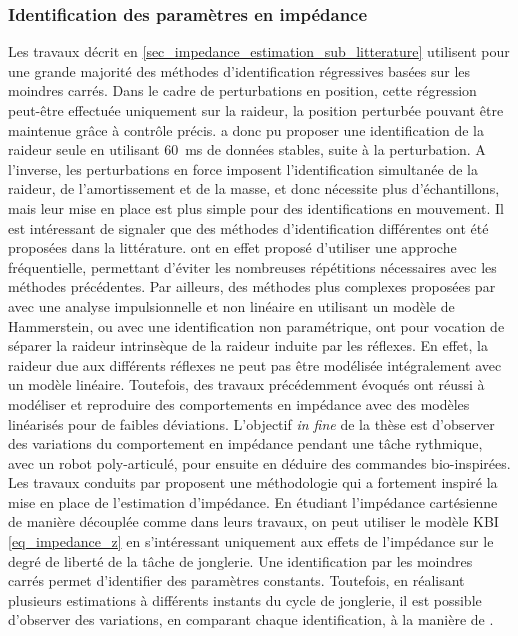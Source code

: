 \documentclass[12pt, a4paper]{article} %
\numberwithin{equation}{section}
\begin{document}
\subsubsection{Identification des paramètres en impédance} \label{sec_impedance_estimation_sub_tools_sub_optimization}

%
%
Les travaux décrit en \cref{sec_impedance_estimation_sub_litterature} utilisent pour une grande majorité des méthodes d'identification régressives basées sur les moindres carrés. Dans le cadre de perturbations en position, cette régression peut-être effectuée uniquement sur la raideur, la position perturbée pouvant être maintenue grâce à contrôle précis. \cite{burdet_method_2000} a donc pu proposer une identification de la raideur seule en utilisant \SI{60}{\milli\second} de données stables, suite à la perturbation. A l'inverse, les perturbations en force imposent l'identification simultanée de la raideur, de l'amortissement et de la masse, et donc nécessite plus d'échantillons, mais leur mise en place est plus simple pour des identifications en mouvement.
%
\newlineBlank
%
Il est intéressant de signaler que des méthodes d'identification différentes ont été proposées dans la littérature. \cite{piovesan_measuring_2012} ont en effet proposé d'utiliser une approche fréquentielle, permettant d'éviter les nombreuses répétitions nécessaires avec les méthodes précédentes. Par ailleurs, des méthodes plus complexes proposées par \cite{kearney_identification_1997} avec une analyse impulsionnelle et non linéaire en utilisant un modèle de Hammerstein, ou \cite{guarin_unbiased_2018} avec une identification non paramétrique, ont pour vocation de séparer la raideur intrinsèque de la raideur induite par les réflexes. En effet, la raideur due aux différents réflexes ne peut pas être modélisée intégralement avec un modèle linéaire. Toutefois, des travaux précédemment évoqués ont réussi à modéliser et reproduire des comportements en impédance avec des modèles linéarisés pour de faibles déviations. 
%
\newlineBlank
%
L'objectif \textit{in fine} de la thèse est d'observer des variations du comportement en impédance pendant une tâche rythmique, avec un robot poly-articulé, pour ensuite en déduire des commandes bio-inspirées. Les travaux conduits par \cite{erden_end-point_2015,erden_hand_2015} proposent une méthodologie qui a fortement inspiré la mise en place de l'estimation d'impédance. En étudiant l'impédance cartésienne de manière découplée comme dans leurs travaux, on peut utiliser le modèle KBI \cref{eq_impedance_z} en s'intéressant uniquement aux effets de l'impédance sur le degré de liberté de la tâche de jonglerie. Une identification par les moindres carrés permet d'identifier des paramètres constants. Toutefois, en réalisant plusieurs estimations à différents instants du cycle de jonglerie, il est possible d'observer des variations, en comparant chaque identification, à la manière de \cite{tsuji_bio-mimetic_2008}.
\end{document}
